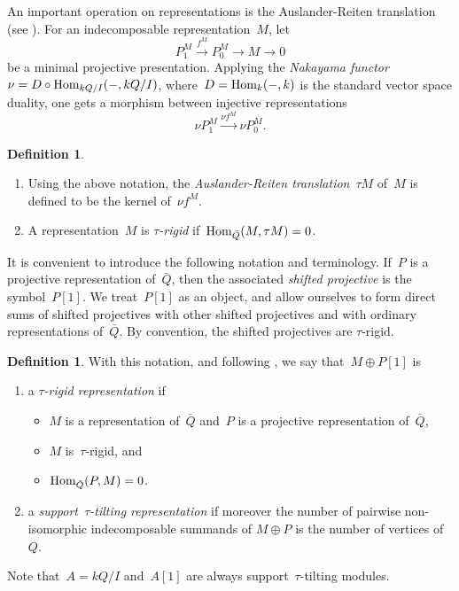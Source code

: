 \documentclass{amsart}
\theoremstyle{definition}
\newtheorem{definition}[theorem]{Definition}
\newcommand{\darkblue}{\color{darkblue}} %
\newcommand{\defn}[1]{\textsl{\darkblue #1}} %
\newcommand{\Hom}[1]{\operatorname{{\rm Hom}}_{#1}}
\begin{document}
An important operation on representations is the Auslander-Reiten translation (see \cite[Chap.~IV]{AssemSimsonSkowronski}).  For an indecomposable representation~$M$, let 
\[
 P_1^M \stackrel{f^M}{\to} P_0^M \to M \to 0 
\]
be a minimal projective presentation.  Applying the \defn{Nakayama functor}~$\nu = D\circ \Hom{kQ/I}(-, kQ/I)$, where~$D = \Hom{k}(-, k)$ is the standard vector space duality, one gets a morphism between injective representations
\[
\nu P_1^M \stackrel{\nu f^M}{\longrightarrow} \nu P_0^M.
\]
\begin{definition}
 \begin{enumerate}
  \item Using the above notation, the \defn{Auslander-Reiten translation}~$\tau M$ of~$M$ is defined to be the kernel of~$\nu f^M$.
  \item \cite{AdachiIyamaReiten} A representation~$M$ is \defn{$\tau$-rigid} if~$\Hom{\bar Q}(M, \tau M) = 0$.
 \end{enumerate}
\end{definition} 

It is convenient to introduce the following notation and terminology.  If~$P$ is a projective representation of~$\bar Q$, then the associated \defn{shifted projective} is the symbol~$P[1]$.  We treat~$P[1]$ as an object, and allow ourselves to form direct sums of shifted projectives with other shifted projectives and with ordinary representations of~$\bar Q$.  By convention, the shifted projectives are $\tau$-rigid.

\begin{definition}
\label{def: tau-rigid and stautilt}
With this notation, and following \cite{AdachiIyamaReiten}, we say that~$M\oplus P[1]$ is
\begin{enumerate}
 \item a \defn{$\tau$-rigid representation} if
   \begin{itemize}
     \item $M$ is a representation of~$\bar Q$ and~$P$ is a projective representation of~$\bar Q$,
     \item $M$ is~$\tau$-rigid, and
     \item $\Hom{\bar Q}(P,M) = 0$.
   \end{itemize}
 \item a \defn{support~$\tau$-tilting representation} if moreover the number of pairwise non-isomorphic indecomposable summands of $M\oplus P$ is the number of vertices of~$Q$.
\end{enumerate}
Note that~$A = kQ/I$ and~$A[1]$ are always support~$\tau$-tilting modules.
\end{definition}
\end{document}
